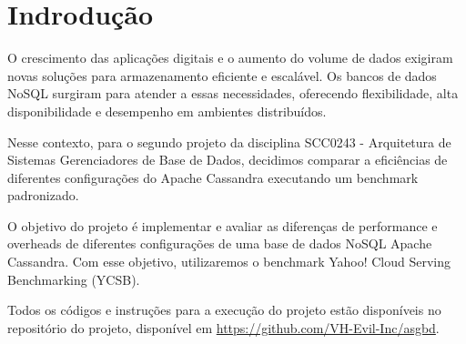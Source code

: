 \section{Indrodução}

O crescimento das aplicações digitais e o aumento do volume de dados exigiram novas soluções para armazenamento eficiente e escalável.
Os bancos de dados NoSQL surgiram para atender a essas necessidades, oferecendo flexibilidade, alta disponibilidade e desempenho em ambientes distribuídos.

Nesse contexto, para o segundo projeto da disciplina SCC0243 - Arquitetura de Sistemas Gerenciadores de Base de Dados,
decidimos comparar a eficiências de diferentes configurações do Apache Cassandra executando um benchmark padronizado.

O objetivo do projeto é implementar e avaliar as diferenças de performance e overheads de diferentes configurações de uma base de dados
NoSQL Apache Cassandra. Com esse objetivo, utilizaremos o benchmark Yahoo! Cloud Serving Benchmarking (YCSB). 

Todos os códigos e instruções para a execução do projeto estão disponíveis no repositório do projeto,
disponível em \url{https://github.com/VH-Evil-Inc/asgbd}.